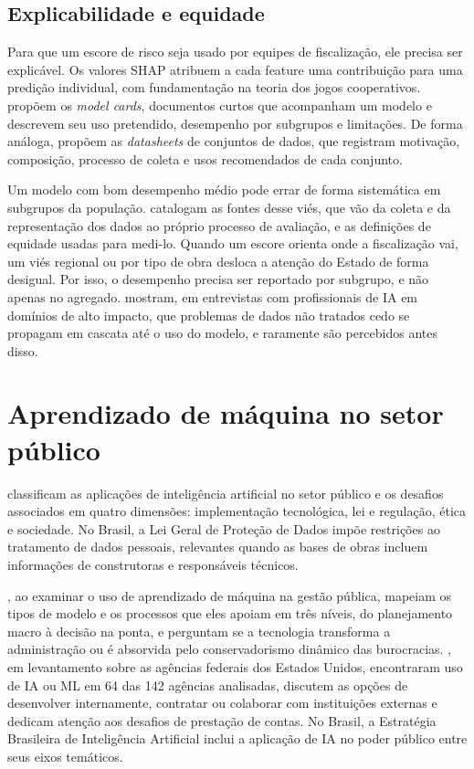 \subsection{Explicabilidade e equidade}

Para que um escore de risco seja usado por equipes de fiscalização, ele precisa ser explicável. Os valores SHAP \cite{lundberg2017} atribuem a cada feature uma contribuição para uma predição individual, com fundamentação na teoria dos jogos cooperativos.  propõem os \textit{model cards}, documentos curtos que acompanham um modelo e descrevem seu uso pretendido, desempenho por subgrupos e limitações. De forma análoga,  propõem as \textit{datasheets} de conjuntos de dados, que registram motivação, composição, processo de coleta e usos recomendados de cada conjunto.

Um modelo com bom desempenho médio pode errar de forma sistemática em subgrupos da população.  catalogam as fontes desse viés, que vão da coleta e da representação dos dados ao próprio processo de avaliação, e as definições de equidade usadas para medi-lo. Quando um escore orienta onde a fiscalização vai, um viés regional ou por tipo de obra desloca a atenção do Estado de forma desigual. Por isso, o desempenho precisa ser reportado por subgrupo, e não apenas no agregado.  mostram, em entrevistas com profissionais de IA em domínios de alto impacto, que problemas de dados não tratados cedo se propagam em cascata até o uso do modelo, e raramente são percebidos antes disso.

\section{Aprendizado de máquina no setor público}
\label{sec:setor-publico}

 classificam as aplicações de inteligência artificial no setor público e os desafios associados em quatro dimensões: implementação tecnológica, lei e regulação, ética e sociedade. No Brasil, a Lei Geral de Proteção de Dados \cite{brasil2018lgpd} impõe restrições ao tratamento de dados pessoais, relevantes quando as bases de obras incluem informações de construtoras e responsáveis técnicos.

, ao examinar o uso de aprendizado de máquina na gestão pública, mapeiam os tipos de modelo e os processos que eles apoiam em três níveis, do planejamento macro à decisão na ponta, e perguntam se a tecnologia transforma a administração ou é absorvida pelo conservadorismo dinâmico das burocracias. , em levantamento sobre as agências federais dos Estados Unidos, encontraram uso de IA ou ML em 64 das 142 agências analisadas, discutem as opções de desenvolver internamente, contratar ou colaborar com instituições externas e dedicam atenção aos desafios de prestação de contas. No Brasil, a Estratégia Brasileira de Inteligência Artificial \cite{brasil2021ebia} inclui a aplicação de IA no poder público entre seus eixos temáticos.

